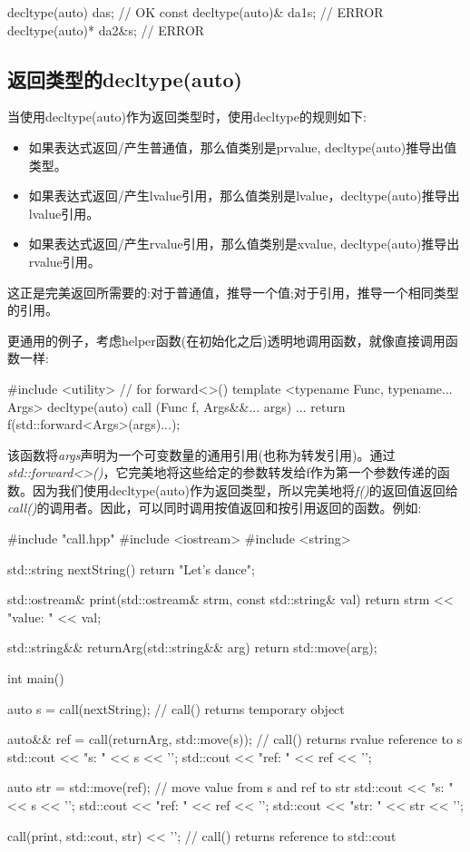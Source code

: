 \begin{cppcode}
decltype(auto) da{s}; // OK
const decltype(auto)& da1{s}; // ERROR
decltype(auto)* da2{&s}; // ERROR
\end{cppcode}

\subsection{返回类型的decltype(auto)}

当使用decltype(auto)作为返回类型时，使用decltype的规则如下:

\begin{itemize}
	\item 如果表达式返回/产生普通值，那么值类别是prvalue, decltype(auto)推导出值类型。
	\item 如果表达式返回/产生lvalue引用，那么值类别是lvalue，decltype(auto)推导出lvalue引用。
	\item 如果表达式返回/产生rvalue引用，那么值类别是xvalue, decltype(auto)推导出rvalue引用。
\end{itemize}

这正是完美返回所需要的:对于普通值，推导一个值;对于引用，推导一个相同类型的引用。

更通用的例子，考虑helper函数(在初始化之后)透明地调用函数，就像直接调用函数一样:

\begin{cppcode}
#include <utility> // for forward<>()
template <typename Func, typename... Args>
decltype(auto) call (Func f, Args&&... args)
{
	...
	return f(std::forward<Args>(args)...);
}
\end{cppcode}

该函数将\textit{args}声明为一个可变数量的通用引用(也称为转发引用)。通过\textit{std::forward<>()}，它完美地将这些给定的参数转发给f作为第一个参数传递的函数。因为我们使用decltype(auto)作为返回类型，所以完美地将\textit{f()}的返回值返回给\textit{call()}的调用者。因此，可以同时调用按值返回和按引用返回的函数。例如:

\begin{cppcode}
#include "call.hpp"
#include <iostream>
#include <string>

std::string nextString()
{
	return "Let's dance";
}

std::ostream& print(std::ostream& strm, const std::string& val)
{
	return strm << "value: " << val;
}

std::string&& returnArg(std::string&& arg)
{
	return std::move(arg);
}

int main()
{
	auto s = call(nextString); // call() returns temporary object
	
	auto&& ref = call(returnArg, std::move(s)); // call() returns rvalue reference to s
	std::cout << "s: " << s << '\n';
	std::cout << "ref: " << ref << '\n';
	
	auto str = std::move(ref); // move value from s and ref to str
	std::cout << "s: " << s << '\n';
	std::cout << "ref: " << ref << '\n';
	std::cout << "str: " << str << '\n';
	
	call(print, std::cout, str) << '\n'; // call() returns reference to std::cout
}
\end{cppcode}

